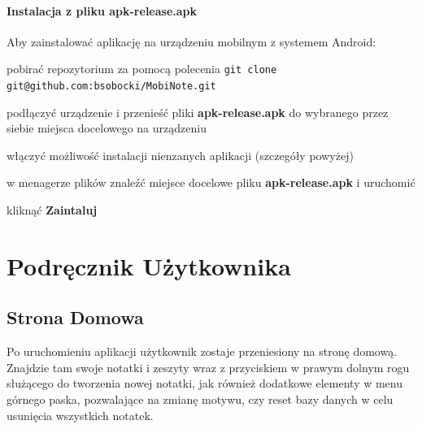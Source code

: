 \documentclass[shortabstract]{iithesis}
\begin{document}
\subsubsection{Instalacja z pliku apk-release.apk}

Aby zainstalować aplikację na urządzeniu mobilnym z systemem Android:

\begin{compactitem}
    \setlength\itemsep{0mm}
    \item pobirać repozytorium za pomocą polecenia
    \newline
    \verb|git clone git@github.com:bsobocki/MobiNote.git|
    \item podłączyć urządzenie i przenieść pliki \textbf{apk-release.apk} do wybranego przez siebie miejsca docelowego na urządzeniu
    \item włączyć możliwość instalacji nienzanych aplikacji (szczegóły powyżej)
    \item w menagerze plików znaleźć miejsce docelowe pliku \textbf{apk-release.apk} i uruchomić
    \item kliknąć \textbf{Zaintaluj}
\end{compactitem}

\chapter{Podręcznik Użytkownika}

\section{Strona Domowa}

Po uruchomieniu aplikacji użytkownik zostaje przeniesiony na stronę domową. Znajdzie tam swoje notatki i zeszyty wraz z przyciskiem w prawym dolnym rogu służącego do tworzenia nowej notatki, jak również dodatkowe elementy w menu górnego paska, pozwalające na zmianę motywu, czy reset bazy danych w celu usunięcia wszystkich notatek. 
\end{document}
